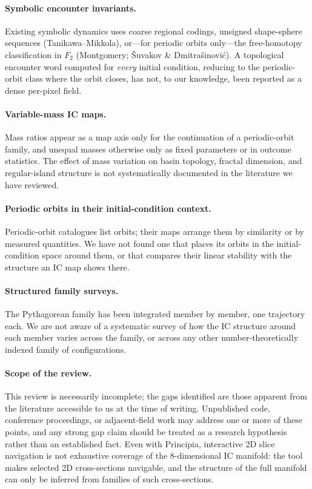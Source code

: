\documentclass[11pt,a4paper]{article}
\begin{document}
\paragraph{Symbolic encounter invariants.}
Existing symbolic dynamics uses coarse regional codings, unsigned shape-sphere sequences
(Tanikawa--Mikkola), or---for periodic orbits only---the free-homotopy classification in $F_2$
(Montgomery; \v{S}uvakov \& Dmitra\v{s}inovi\'{c}).  A topological encounter word computed for
\emph{every} initial condition, reducing to the periodic-orbit class where the orbit closes, has
not, to our knowledge, been reported as a dense per-pixel field.

\paragraph{Variable-mass IC maps.}
Mass ratios appear as a map axis only for the continuation of a periodic-orbit family, and unequal
masses otherwise only as fixed parameters or in outcome statistics.  The effect of mass variation
on basin topology, fractal dimension, and regular-island structure is not systematically
documented in the literature we have reviewed.

\paragraph{Periodic orbits in their initial-condition context.}
Periodic-orbit catalogues list orbits; their maps arrange them by similarity or by measured
quantities.  We have not found one that places its orbits in the initial-condition space around
them, or that compares their linear stability with the structure an IC map shows there.

\paragraph{Structured family surveys.}
The Pythagorean family has been integrated member by member, one trajectory each.  We are not
aware of a systematic survey of how the IC structure around each member varies across the family,
or across any other number-theoretically indexed family of configurations.

\paragraph{Scope of the review.}
This review is necessarily incomplete; the gaps identified are those apparent from the literature
accessible to us at the time of writing.  Unpublished code, conference proceedings, or
adjacent-field work may address one or more of these points, and any strong gap claim should be
treated as a research hypothesis rather than an established fact.  Even with Principia,
interactive 2D slice navigation is not exhaustive coverage of the 8-dimensional IC manifold: the
tool makes selected 2D cross-sections navigable, and the structure of the full manifold can only
be inferred from families of such cross-sections.
\end{document}
